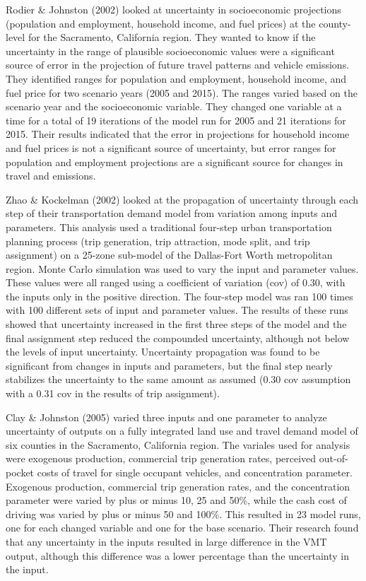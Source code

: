 \documentclass[fancy, masters,twoside]{byuthesis}
\begin{document}
Rodier \& Johnston (2002) looked at uncertainty in socioeconomic projections (population and employment, household income, and fuel prices) at the county-level for the Sacramento, California region. They wanted to know if the uncertainty in the range of plausible socioeconomic values were a significant source of error in the projection of future travel patterns and vehicle emissions. They identified ranges for population and employment, household income, and fuel price for two scenario years (2005 and 2015). The ranges varied based on the scenario year and the socioeconomic variable. They changed one variable at a time for a total of 19 iterations of the model run for 2005 and 21 iterations for 2015. Their results indicated that the error in projections for household income and fuel prices is not a significant source of uncertainty, but error ranges for population and employment projections are a significant source for changes in travel and emissions.

Zhao \& Kockelman (2002) looked at the propagation of uncertainty through each step of their transportation demand model from variation among inputs and parameters. This analysis used a traditional four-step urban transportation planning process (trip generation, trip attraction, mode split, and trip assignment) on a 25-zone sub-model of the Dallas-Fort Worth metropolitan region. Monte Carlo simulation was used to vary the input and parameter values. These values were all ranged using a coefficient of variation (cov) of 0.30, with the inputs only in the positive direction. The four-step model was ran 100 times with 100 different sets of input and parameter values. The results of these runs showed that uncertainty increased in the first three steps of the model and the final assignment step reduced the compounded uncertainty, although not below the levels of input uncertainty. Uncertainty propagation was found to be significant from changes in inputs and parameters, but the final step nearly stabilizes the uncertainty to the same amount as assumed (0.30 cov assumption with a 0.31 cov in the results of trip assignment).

Clay \& Johnston (2005) varied three inputs and one parameter to analyze uncertainty of outputs on a fully integrated land use and travel demand model of six counties in the Sacramento, California region. The variales used for analysis were exogenous production, commercial trip generation rates, perceived out-of-pocket costs of travel for single occupant vehicles, and concentration parameter. Exogenous production, commercial trip generation rates, and the concentration parameter were varied by plus or minus 10, 25 and 50\%, while the cash cost of driving was varied by plus or minus 50 and 100\%. This resulted in 23 model runs, one for each changed variable and one for the base scenario. Their research found that any uncertainty in the inputs resulted in large difference in the VMT output, although this difference was a lower percentage than the uncertainty in the input.
\end{document}
